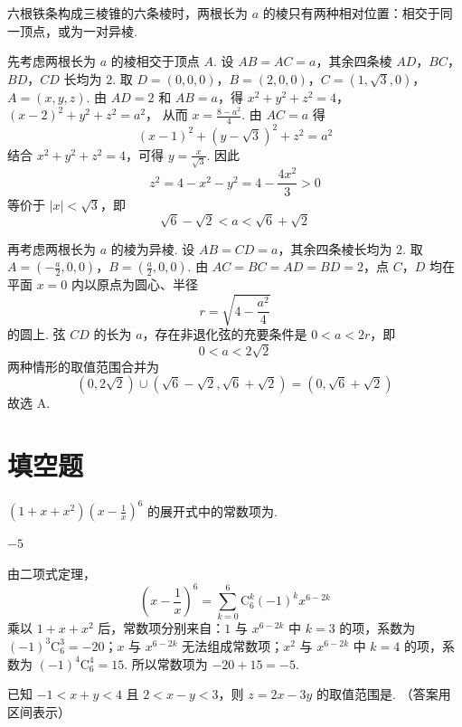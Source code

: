 \begin{solution}
六根铁条构成三棱锥的六条棱时，两根长为 \(a\) 的棱只有两种相对位置：相交于同一顶点，或为一对异棱.

先考虑两根长为 \(a\) 的棱相交于顶点 \(A\). 设 \(AB=AC=a\)，其余四条棱 \(AD\)，\(BC\)，\(BD\)，\(CD\) 长均为 \(2\).
取 \(D=(0,0,0)\)，\(B=(2,0,0)\)，\(C=(1,\sqrt{3},0)\)，\(A=(x,y,z)\).
由 \(AD=2\) 和 \(AB=a\)，得 \(x^{2}+y^{2}+z^{2}=4\)，\((x-2)^{2}+y^{2}+z^{2}=a^{2}\)，
从而 \(x=\frac{8-a^{2}}{4}\). 由 \(AC=a\) 得
\[
(x-1)^{2}+(y-\sqrt{3})^{2}+z^{2}=a^{2}
\]
结合 \(x^{2}+y^{2}+z^{2}=4\)，可得 \(y=\frac{x}{\sqrt{3}}\). 因此
\[
z^{2}=4-x^{2}-y^{2}=4-\frac{4x^{2}}{3}>0
\]
等价于 \(|x|<\sqrt{3}\)，即
\[
\sqrt{6}-\sqrt{2}<a<\sqrt{6}+\sqrt{2}
\]

再考虑两根长为 \(a\) 的棱为异棱. 设 \(AB=CD=a\)，其余四条棱长均为 \(2\).
取 \(A=\left(-\frac{a}{2},0,0\right)\)，\(B=\left(\frac{a}{2},0,0\right)\).
由 \(AC=BC=AD=BD=2\)，点 \(C\)，\(D\) 均在平面 \(x=0\) 内以原点为圆心、半径
\[
r=\sqrt{4-\frac{a^{2}}{4}}
\]
的圆上. 弦 \(CD\) 的长为 \(a\)，存在非退化弦的充要条件是 \(0<a<2r\)，即
\[
0<a<2\sqrt{2}
\]
两种情形的取值范围合并为
\[
(0,2\sqrt{2})\cup(\sqrt{6}-\sqrt{2},\sqrt{6}+\sqrt{2})=(0,\sqrt{6}+\sqrt{2})
\]
故选 A.
\end{solution}

\section{填空题}

\begin{problem}
\((1 + x + x^2)\left(x - \frac{1}{x}\right)^6\) 的展开式中的常数项为\fillinblank{}.
\end{problem}

\begin{answer}
\(-5\)
\end{answer}

\begin{solution}
由二项式定理，
\[
\left(x-\frac{1}{x}\right)^{6}=\sum_{k=0}^{6}\mathrm C_{6}^{k}(-1)^{k}x^{6-2k}
\]
乘以 \(1+x+x^{2}\) 后，常数项分别来自：\(1\) 与 \(x^{6-2k}\) 中 \(k=3\) 的项，系数为 \((-1)^{3}\mathrm C_{6}^{3}=-20\)；\(x\) 与 \(x^{6-2k}\) 无法组成常数项；\(x^{2}\) 与 \(x^{6-2k}\) 中 \(k=4\) 的项，系数为 \((-1)^{4}\mathrm C_{6}^{4}=15\). 所以常数项为 \(-20+15=-5\).
\end{solution}

\begin{problem}
已知 \(-1 < x + y < 4\) 且 \(2 < x - y < 3\)，则 \(z = 2x - 3y\) 的取值范围是\fillinblank{}. （答案用区间表示）
\end{problem}

